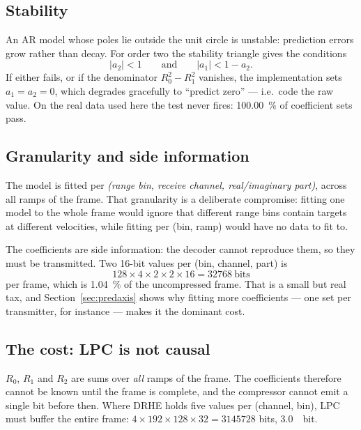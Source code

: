 \subsection{Stability}

An AR model whose poles lie outside the unit circle is unstable: prediction
errors grow rather than decay. For order two the stability triangle gives the
conditions
\begin{equation}
\label{eq:stability}
|a_2| < 1
\qquad\text{and}\qquad
|a_1| < 1 - a_2 .
\end{equation}
If either fails, or if the denominator $R_0^2 - R_1^2$ vanishes, the
implementation sets $a_1 = a_2 = 0$, which degrades gracefully to ``predict
zero'' --- i.e.\ code the raw value. On the real data used here the test never
fires: \SI{100.00}{\percent} of coefficient sets pass.

\subsection{Granularity and side information}

The model is fitted per \emph{(range bin, receive channel, real/imaginary
part)}, across all ramps of the frame. That granularity is a deliberate
compromise: fitting one model to the whole frame would ignore that different
range bins contain targets at different velocities, while fitting per (bin,
ramp) would have no data to fit to.

The coefficients are side information: the decoder cannot reproduce them, so
they must be transmitted. Two 16-bit values per (bin, channel, part) is
\begin{equation}
128 \times 4 \times 2 \times 2 \times 16 = \num{32768}\ \text{bits}
\end{equation}
per frame, which is \SI{1.04}{\percent} of the uncompressed frame. That is a
small but real tax, and Section~\ref{sec:predaxis} shows why fitting more
coefficients --- one set per transmitter, for instance --- makes it the
dominant cost.

\subsection{The cost: LPC is not causal}

$R_0$, $R_1$ and $R_2$ are sums over \emph{all} ramps of the frame. The
coefficients therefore cannot be known until the frame is complete, and the
compressor cannot emit a single bit before then. Where DRHE holds five values
per (channel, bin), LPC must buffer the entire frame:
$4 \times 192 \times 128 \times 32 = \num{3145728}$ bits, \SI{3.0}{\mebi bit}.

